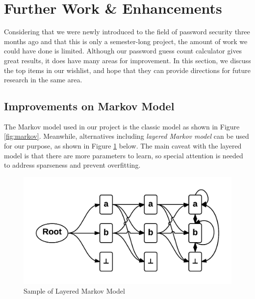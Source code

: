 \documentclass{article} %
\theoremstyle{definition}
\theoremstyle{theorem}
\theoremstyle{remark}
\theoremstyle{remark}
\begin{document}
\section{Further Work \& Enhancements}

\par\quad Considering that we were newly introduced to the field of password security three months ago and that this is only a semester-long project, the amount of work we could have done is limited. Although our password guess count calculator gives great results, it does have many areas for improvement. In this section, we discuss the top items in our wishlist, and hope that they can provide directions for future research in the same area.

\subsection{Improvements on Markov Model}
\par\quad The Markov model used in our project is the classic model as shown in Figure \ref{fig:markov}. Meanwhile, alternatives including \emph{layered Markov model} can be used for our purpose, as shown in Figure \ref{fig:layered} below. The main caveat with the layered model is that there are more parameters to learn, so special attention is needed to address sparseness and prevent overfitting.

    \begin{figure}[!htbp]
        \vspace{-15pt}
        \begin{center}
            \includegraphics[width=.6\textwidth]{diag/layered-markov.png}
        \end{center}
        \vspace{-15pt}
        \caption{Sample of Layered Markov Model}
         \vspace{-5pt}
        \label{fig:layered}
    \end{figure}
\end{document}
